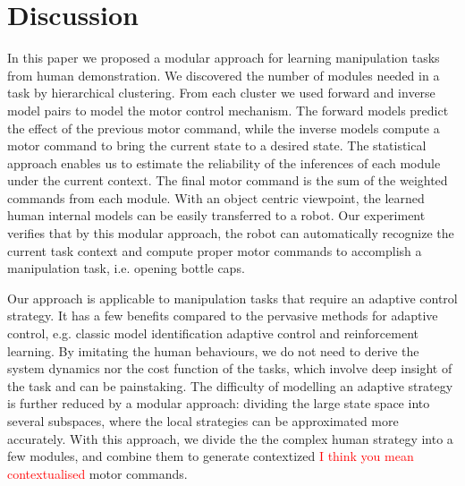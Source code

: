 \section{Discussion}
\label{cha4:sec4}

In this paper we proposed a modular approach for learning manipulation tasks from human demonstration. We discovered the number of modules needed in a task by hierarchical clustering. From each cluster we used forward and inverse model pairs to model the motor control mechanism. The forward models predict the effect of the previous motor command, while the inverse models compute a motor command to bring the current state to a desired state. The statistical approach enables us to estimate the reliability of the inferences of each module under the current context. The final motor command is the sum of the weighted commands from each module. With an object centric viewpoint, the learned human internal models can be easily transferred to a robot. Our experiment verifies that by this modular approach, the robot can automatically recognize the current task context and compute proper motor commands to accomplish a manipulation task, i.e. opening bottle caps.


Our approach is applicable to manipulation tasks that require an adaptive control strategy. It has a few benefits compared to the pervasive methods for adaptive control, e.g. classic model identification adaptive control and reinforcement learning. By imitating the human behaviours, we do not need to derive the system dynamics nor the cost function of the tasks, which involve deep insight of the task and can be painstaking. The difficulty of modelling an adaptive strategy is further reduced by a modular approach: dividing the large state space into several subspaces, where the local strategies can be approximated more accurately. With this approach, we divide the the complex human strategy into a few modules, and combine them to generate contextized \textcolor{red}{I think you mean contextualised} motor commands.

